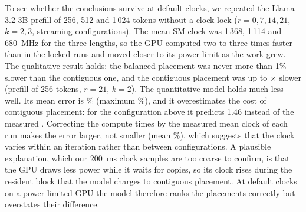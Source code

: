 To see whether the conclusions survive at default clocks, we repeated the Llama-3.2-3B prefill of 256, 512 and 1\,024 tokens without a clock lock ($r=0,7,14,21$, $k=2,3$, \nUnlockedN{} streaming configurations). The mean SM clock was 1\,368, 1\,114 and 680~MHz for the three lengths, so the GPU computed two to three times faster than in the locked runs and moved closer to its power limit as the work grew. The qualitative result holds: the balanced placement was never more than 1\% slower than the contiguous one, and the contiguous placement was up to \nUnlockedPenaltyMax$\times$ slower (prefill of 256 tokens, $r=21$, $k=2$). The quantitative model holds much less well. Its mean error is \nUnlockedMape\% (maximum \nUnlockedMax\%), and it overestimates the cost of contiguous placement: for the configuration above it predicts 1.46 instead of the measured \nUnlockedPenaltyMax. Correcting the compute times by the measured mean clock of each run makes the error larger, not smaller (mean \nUnlockedMapeClk\%), which suggests that the clock varies within an iteration rather than between configurations. A plausible explanation, which our 200~ms clock samples are too coarse to confirm, is that the GPU draws less power while it waits for copies, so its clock rises during the resident block that the model charges to contiguous placement. At default clocks on a power-limited GPU the model therefore ranks the placements correctly but overstates their difference.
